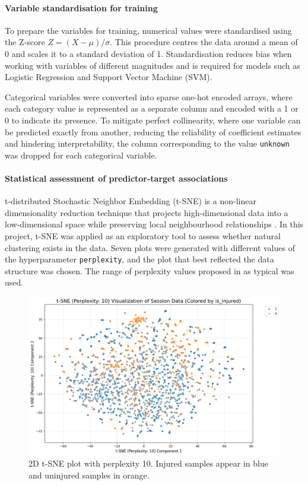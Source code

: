 \paragraph{Variable standardisation for training}
To prepare the variables for training, numerical values were standardised using the Z-score $Z = (X - \mu) / \sigma$. This procedure centres the data around a mean of 0 and scales it to a standard deviation of 1. Standardisation reduces bias when working with variables of different magnitudes and is required for models such as Logistic Regression and Support Vector Machine (SVM).

Categorical variables were converted into sparse one-hot encoded arrays, where each category value is represented as a separate column and encoded with a 1 or 0 to indicate its presence. To mitigate perfect collinearity, where one variable can be predicted exactly from another, reducing the reliability of coefficient estimates and hindering interpretability, the column corresponding to the value \texttt{unknown} was dropped for each categorical variable.


\paragraph{Statistical assessment of predictor-target associations}
t-distributed Stochastic Neighbor Embedding (t-SNE) is a non-linear dimensionality reduction technique that projects high-dimensional data into a low-dimensional space while preserving local neighbourhood relationships \citep{JMLR:v9:vandermaaten08a}. In this project, t-SNE was applied as an exploratory tool to assess whether natural clustering exists in the data. Seven plots were generated with different values of the hyperparameter \texttt{perplexity}, and the plot that best reflected the data structure was chosen. The range of perplexity values proposed in \citet{JMLR:v9:vandermaaten08a} as typical was used.  

\begin{figure}[ht]
    \centering
    \includegraphics[width=0.5\columnwidth]{images/t-sne-p10-scatter-is_injured.png}
    \caption[2D t-SNE plot with perplexity 10]{2D t-SNE plot with perplexity 10. Injured samples appear in blue and uninjured samples in orange.\label{fig:met-tsne-injured}}
\end{figure}

